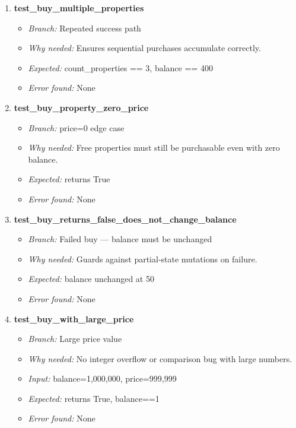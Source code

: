 \documentclass{article}
\begin{document}
\begin{enumerate}[resume, label=\textbf{TC\arabic*.}]
  \item \textbf{test\_buy\_multiple\_properties}
  \begin{itemize}[noitemsep]
    \item \textit{Branch:} Repeated success path
    \item \textit{Why needed:} Ensures sequential purchases accumulate correctly.
    \item \textit{Expected:} count\_properties == 3, balance == 400
    \item \textit{Error found:} None
  \end{itemize}

  \item \textbf{test\_buy\_property\_zero\_price}
  \begin{itemize}[noitemsep]
    \item \textit{Branch:} price=0 edge case
    \item \textit{Why needed:} Free properties must still be purchasable even with zero balance.
    \item \textit{Expected:} returns True
    \item \textit{Error found:} None
  \end{itemize}

  \item \textbf{test\_buy\_returns\_false\_does\_not\_change\_balance}
  \begin{itemize}[noitemsep]
    \item \textit{Branch:} Failed buy — balance must be unchanged
    \item \textit{Why needed:} Guards against partial-state mutations on failure.
    \item \textit{Expected:} balance unchanged at 50
    \item \textit{Error found:} None
  \end{itemize}

  \item \textbf{test\_buy\_with\_large\_price}
  \begin{itemize}[noitemsep]
    \item \textit{Branch:} Large price value
    \item \textit{Why needed:} No integer overflow or comparison bug with large numbers.
    \item \textit{Input:} balance=1{,}000{,}000, price=999{,}999
    \item \textit{Expected:} returns True, balance==1
    \item \textit{Error found:} None
  \end{itemize}

\end{enumerate}
\end{document}
